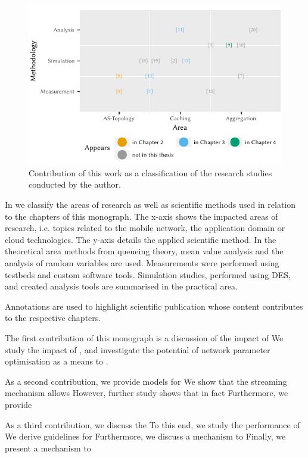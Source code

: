 \begin{figure}
\centering
\includegraphics{figures/publications}
\caption{Contribution of this work as a classification of the research studies conducted by the author.}\label{fig:introduction:publications}
\end{figure}

In  we classify the areas of research as well as scientific methods used in relation to the chapters of this monograph.
The x-axis shows the impacted areas of research, i.e. topics related to the mobile network, the application domain or cloud technologies.
The y-axis details the applied scientific method.
In the theoretical area methods from queueing theory, mean value analysis and the analysis of random variables are used.
Measurements were performed using testbeds and custom software tools.
Simulation studies, performed using \gls{DES}, and created analysis tools are summarised in the practical area.

Annotations are used to highlight scientific publication whose content contributes to the respective chapters.

The first contribution of this monograph is a discussion of the impact of
We study the impact of , and investigate the potential of network parameter optimisation as a means to .

As a second contribution, we provide models for
We show that the streaming mechanism allows
However, further study shows that in fact
Furthermore, we provide

As a third contribution, we discuss the
To this end, we study the performance of
We derive guidelines for
Furthermore, we discuss a mechanism to
Finally, we present a mechanism to

